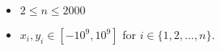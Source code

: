 \begin{itemize}
\tightlist
\item $2\le n\le 2000$
\item $x_i,y_i\in [-10^9, 10^9]$ for $i\in \{1,2,\ldots,n\}$.
\end{itemize}

